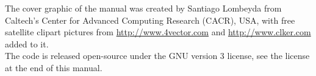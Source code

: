 The cover graphic of the manual was created by Santiago Lombeyda from
Caltech's Center for Advanced Computing Research (CACR), USA, with free satellite clipart pictures
from \url{http://www.4vector.com} and \url{http://www.clker.com} added to it.\\

The code is released open-source under the GNU version 3 license, see the license at the end of this manual.\\

